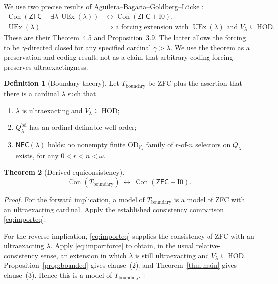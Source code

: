 \documentclass[11pt,letterpaper]{article}
\theoremstyle{definition}
\newtheorem{definition}{Definition}[section]
\newtheorem{theorem}[definition]{Theorem}
\newcommand{\ZFC}{\mathsf{ZFC}}
\newcommand{\HOD}{\mathrm{HOD}}
\newcommand{\OD}{\mathrm{OD}}
\newcommand{\UEx}{\operatorname{UEx}}
\newcommand{\Con}{\operatorname{Con}}
\newcommand{\Izero}{\mathrm{I0}}
\newcommand{\bd}{\mathrm{bd}}
\newcommand{\NFC}{\mathsf{NFC}}
\newcommand{\Tbd}{T_{\mathrm{boundary}}}
\begin{document}
We use two precise results of Aguilera--Bagaria--Goldberg--L\"ucke \cite{abgl}:
\begin{align}
 \Con(\ZFC+\exists\lambda\,\UEx(\lambda))
 &\longleftrightarrow\Con(\ZFC+\Izero),\label{eq:importeq}\\
 \UEx(\lambda)&\Longrightarrow
 \text{a forcing extension with }\UEx(\lambda)
 \text{ and }V_\lambda\subseteq\HOD.\label{eq:importforce}
\end{align}
These are their Theorem~4.5 and Proposition~3.9. The latter allows the forcing to be $\gamma$-directed closed for any specified cardinal $\gamma>\lambda$. We use the theorem as a preservation-and-coding result, not as a claim that arbitrary coding forcing preserves ultraexactingness.

\begin{definition}[Boundary theory]\label{def:boundary}
Let $\Tbd$ be ZFC plus the assertion that there is a cardinal $\lambda$ such that
\begin{enumerate}
\item $\lambda$ is ultraexacting and $V_\lambda\subseteq\HOD$;
\item $Q^\bd_\lambda$ has an ordinal-definable well-order;
\item $\NFC(\lambda)$ holds: no nonempty finite $\OD_{V_\lambda}$ family of $r$-of-$n$ selectors on $Q_\lambda$ exists, for any $0<r<n<\omega$.
\end{enumerate}
\end{definition}

\begin{theorem}[Derived equiconsistency]\label{thm:equiconsistency}
\begin{equation}\label{eq:boundaryeq}
 \boxed{\quad
 \Con(\Tbd)\ \longleftrightarrow\ \Con(\ZFC+\Izero).
 \quad}
\end{equation}
\end{theorem}

\begin{proof}
For the forward implication, a model of $\Tbd$ is a model of ZFC with an ultraexacting cardinal. Apply the established consistency comparison \eqref{eq:importeq}.

For the reverse implication, \eqref{eq:importeq} supplies the consistency of ZFC with an ultraexacting $\lambda$. Apply \eqref{eq:importforce} to obtain, in the usual relative-consistency sense, an extension in which $\lambda$ is still ultraexacting and $V_\lambda\subseteq\HOD$. Proposition~\ref{prop:bounded} gives clause~(2), and Theorem~\ref{thm:main} gives clause~(3). Hence this is a model of $\Tbd$.
\end{proof}
\end{document}
